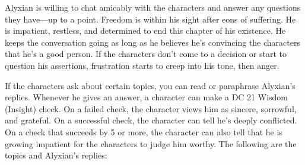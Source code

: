 \documentclass[10pt,a4paper,twoside,bg=print,twocolumn,openany,nodeprecatedcode]{dndbook}
\begin{document}
Alyxian is willing to chat amicably with the characters and answer any questions they have—up to a point. Freedom is within his sight after eons of suffering. He is impatient, restless, and determined to end this chapter of his existence. He keeps the conversation going as long as he believes he's convincing the characters that he's a good person. If the characters don't come to a decision or start to question his assertions, frustration starts to creep into his tone, then anger.

If the characters ask about certain topics, you can read or paraphrase Alyxian's replies. Whenever he gives an answer, a character can make a DC 21 Wisdom (Insight) check. On a failed check, the character views him as sincere, sorrowful, and grateful. On a successful check, the character can tell he's deeply conflicted. On a check that succeeds by 5 or more, the character can also tell that he is growing impatient for the characters to judge him worthy. The following are the topics and Alyxian's replies:
\end{document}

